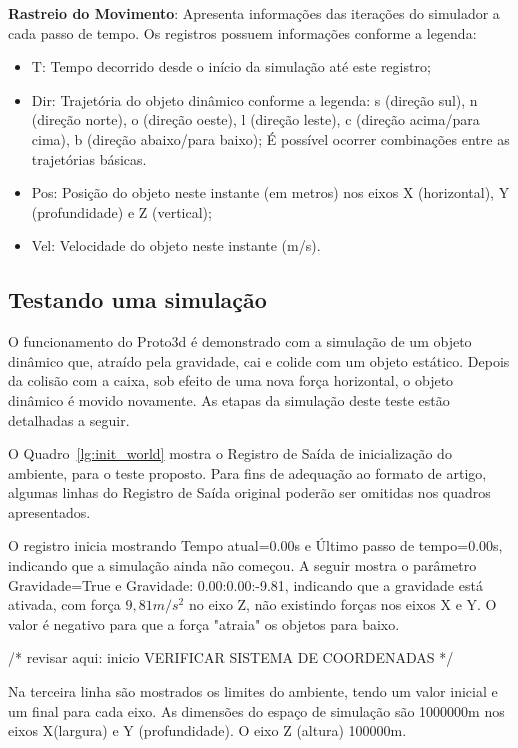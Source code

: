 \documentclass[12pt]{article}
\begin{document}
\textbf{Rastreio do Movimento}: Apresenta informações das iterações do simulador a cada passo de tempo. Os registros possuem informações conforme a legenda:

\begin{itemize}
	\item T: Tempo decorrido desde o início da simulação até este registro;
	\item Dir: Trajetória do objeto dinâmico conforme a legenda: s (direção sul), n (direção norte), o (direção oeste), l (direção leste), c (direção acima/para cima), b (direção abaixo/para baixo); É possível ocorrer combinações entre as trajetórias básicas. 
	\item Pos: Posição do objeto neste instante (em metros) nos eixos X (horizontal), Y (profundidade) e Z (vertical);
	\item Vel: Velocidade do objeto neste instante (m/s).
\end{itemize}

\subsection{Testando uma simulação}
O funcionamento do Proto3d é demonstrado com a simulação de um objeto dinâmico que, atraído pela gravidade, cai e colide com um objeto estático. Depois da colisão com a caixa, sob efeito de uma nova força horizontal, o objeto dinâmico é movido novamente. As etapas da simulação deste teste estão detalhadas a seguir.  

O Quadro~\ref{lg:init_world} mostra o Registro de Saída de inicialização do ambiente, para o teste proposto. Para fins de adequação ao formato de artigo, algumas linhas do Registro de Saída original poderão ser omitidas nos quadros apresentados.

O registro inicia mostrando Tempo atual=0.00s e Último passo de tempo=0.00s, indicando que a simulação ainda não começou. A seguir mostra o parâmetro Gravidade=True e Gravidade: 0.00:0.00:-9.81, indicando que a gravidade está ativada, com força $9,81 m/s^{2}$ no eixo Z, não existindo forças nos eixos X e Y. O valor é negativo para que a força "atraia" os objetos para baixo. 

/* revisar aqui:  inicio VERIFICAR SISTEMA DE COORDENADAS */ 

Na terceira linha são mostrados os limites do ambiente, tendo um valor inicial e um final para cada eixo. As dimensões do espaço de simulação são 1000000m nos eixos X(largura) e Y (profundidade). O eixo Z (altura) 100000m. 
\end{document}
